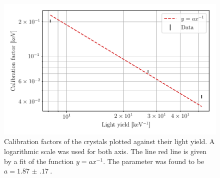 \documentclass[a4paper, 11pt, table]{article}
\begin{document}
\begin{figure}[H]
    \includegraphics[width=\textwidth]{figures/light_yield.pdf}
    \caption{Calibration factors of the crystals plotted against their light yield. A logarithmic scale was used for both axis. The line red line is given by a fit of the function $y=ax^{-1}$. The parameter was found to be $a = \SI{1.87(17)}{}$.}
    \label{fig:light_yield}
\end{figure}
\end{document}
